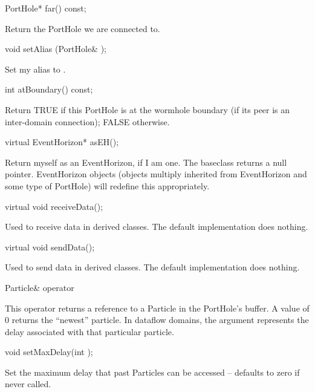 \begin{example}
PortHole* far() const;
\end{example}

Return the PortHole we are connected to.

\begin{example}
void setAlias (PortHole& );
\end{example}

Set my alias to .

\begin{example}
int atBoundary() const;
\end{example}

Return TRUE if this PortHole is at the wormhole boundary (if its peer is
an inter-domain connection); FALSE otherwise.

\begin{example}
virtual EventHorizon* asEH();
\end{example}

Return myself as an EventHorizon, if I am one.  The baseclass returns
a null pointer.  EventHorizon objects (objects multiply inherited from
EventHorizon and some type of PortHole) will redefine this
appropriately.

\begin{example}
virtual void receiveData();
\end{example}

Used to receive data in derived classes.  The default implementation
does nothing.

\begin{example}
virtual void sendData();
\end{example}

Used to send data in derived classes.  The default implementation
does nothing.

\begin{example}
Particle& operator %
\end{example}

This operator returns a reference to a Particle in the PortHole's
buffer.  A  value of 0 returns the ``newest'' particle.
In dataflow domains, the argument represents the delay associated
with that particular particle.

\begin{example}
void setMaxDelay(int );
\end{example}

Set the maximum delay that past Particles can be accessed -- defaults to
zero if never called.

